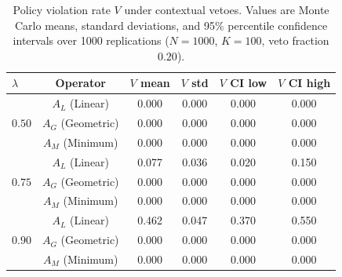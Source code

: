 \begin{table}[H]
\caption{Policy violation rate $V$ under contextual vetoes. Values are Monte Carlo means, standard deviations, and 95\% percentile confidence intervals over 1000 replications ($N=1000$, $K=100$, veto fraction $0.20$).}
\label{tab:policy-compliance}
\centering
\small
\renewcommand{\arraystretch}{1.2}
\begin{tabular}{lccccc}
\toprule
$\lambda$ & Operator & $V$ mean & $V$ std & $V$ CI low & $V$ CI high \\
\midrule
\multirow{3}{*}{$0.50$} & $A_L$ (Linear) & 0.000 & 0.000 & 0.000 & 0.000 \\
 & $A_G$ (Geometric) & 0.000 & 0.000 & 0.000 & 0.000 \\
 & $A_M$ (Minimum) & 0.000 & 0.000 & 0.000 & 0.000 \\
\midrule
\multirow{3}{*}{$0.75$} & $A_L$ (Linear) & 0.077 & 0.036 & 0.020 & 0.150 \\
 & $A_G$ (Geometric) & 0.000 & 0.000 & 0.000 & 0.000 \\
 & $A_M$ (Minimum) & 0.000 & 0.000 & 0.000 & 0.000 \\
\midrule
\multirow{3}{*}{$0.90$} & $A_L$ (Linear) & 0.462 & 0.047 & 0.370 & 0.550 \\
 & $A_G$ (Geometric) & 0.000 & 0.000 & 0.000 & 0.000 \\
 & $A_M$ (Minimum) & 0.000 & 0.000 & 0.000 & 0.000 \\
\bottomrule
\end{tabular}
\end{table}
